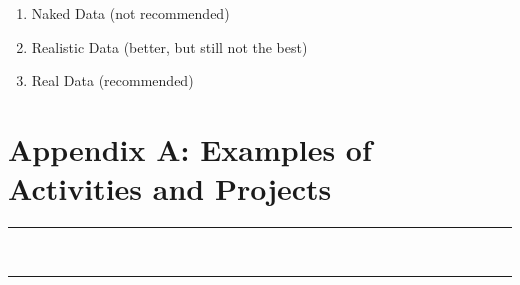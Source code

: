 \documentclass[twoside,openany]{tufte-book}
\begin{document}
\begin{description}
\vspace{.3in}
\item[\allcaps{\textbf{Appendix D: Examples of Naked, Realistic, and Real Data}}] \hfill
	\vspace{-.2in}
	\begin{enumerate}[leftmargin=1cm, itemsep=.2em]
	\item Naked Data (not recommended)
	\item Realistic Data (better, but still not the best)
	\item Real Data (recommended)
	\end{enumerate} 
\end{description}


\chapter{Appendix A: Examples of Activities and Projects}
\vspace{-.53in}
   \noindent\color{graylight}\rule[0cm]{3.25in}{0.03cm} \\
    \noindent\color{graylight}\rule[0.4cm]{3.25in}{0.03cm} \\
\color{black}
\vspace{-.25in}

\renewcommand{\labelitemi}{$\filledsquare$}
\end{document}
